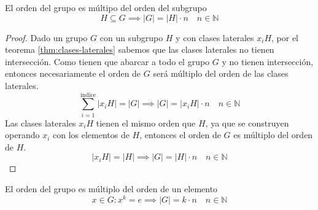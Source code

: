 \begin{thm}
    \label{thm:lagrange}
    El orden del grupo es múltipo del orden del subgrupo
    \begin{equation}
        H \subseteq G \implies |G| = |H| \cdot n \quad n \in \mathbb{N}
    \end{equation}
\end{thm}

\begin{proof}
    Dado un grupo $G$ con un subgrupo $H$ y con clases laterales $x_iH$, por el teorema \ref{thm:clases-laterales} sabemos que las clases laterales no tienen intersección. Como tienen que abarcar a todo el grupo $G$ y no tienen intersección, entonces necesariamente el orden de $G$ será múltiplo del orden de las clases laterales.
    \begin{equation}
        \sum_{i=1}^{\text{índice}} |x_iH| = |G| \implies |G| = |x_iH| \cdot n \quad n \in \mathbb{N}
    \end{equation}
    Las clases laterales $x_iH$ tienen el mismo orden que $H$, ya que se construyen operando $x_i$ con los elementos de $H$, entonces el orden de $G$ es múltiplo del orden de $H$.
    \begin{equation}
        |x_iH| = |H| \implies |G| = |H| \cdot n \quad n \in \mathbb{N}
    \end{equation}
\end{proof}

\begin{cor}
    El orden del grupo es múltiplo del orden de un elemento
    \begin{equation}
        x \in G: x^{k} = e \implies |G| = k \cdot n \quad n \in \mathbb{N}
    \end{equation}
    \label{cor:lagrange}
\end{cor}
